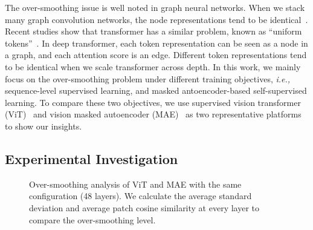 \documentclass{article}
\theoremstyle{plain}
\theoremstyle{definition}
\theoremstyle{remark}
\newcommand{\ie}{\emph{i.e.,}\xspace}
\begin{document}
The over-smoothing issue is well noted in graph neural networks. When we stack many graph convolution networks, the node representations tend to be identical~\citep{chen2020measuring}. Recent studies show that transformer has a similar problem, known as ``uniform tokens''~\citep{shi2021revisiting}. In deep transformer, each token representation can be seen as a node in a graph, and each attention score is an edge. Different token representations tend to be identical when we scale transformer across depth. In this work, we mainly focus on the over-smoothing problem under different training objectives, \ie sequence-level supervised learning, and masked antoencoder-based self-supervised learning. To compare these two objectives, we use supervised vision transformer (ViT)~\citep{dosovitskiy2020image} and vision masked autoencoder (MAE)~\citep{he2021masked} as two representative platforms to show our insights. 




\subsection{Experimental Investigation}\label{sec: experimental investigation}


\begin{figure}[t]

\centering
{}\vspace{-0.4cm}
\vspace{-0.35cm}
\caption{Over-smoothing analysis of ViT and MAE  with the same configuration (48 layers). We calculate the average standard deviation and average patch cosine similarity at every layer to compare the over-smoothing level.}
\label{fig:over-smoothing}
\vspace{-0.4cm}
\end{figure}
\end{document}
